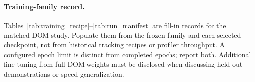 \documentclass[10pt,twocolumn,letterpaper]{article}
\begin{document}
\paragraph{Training-family record.}
Tables~\ref{tab:training_recipe}--\ref{tab:run_manifest} are fill-in records for
the matched DOM study. Populate them from the frozen family and each selected
checkpoint, not from historical tracking recipes or profiler throughput.
A configured epoch limit is distinct from completed epochs; report both.
Additional fine-tuning from full-DOM weights must be disclosed when discussing
held-out demonstrations or speed generalization.
\end{document}
